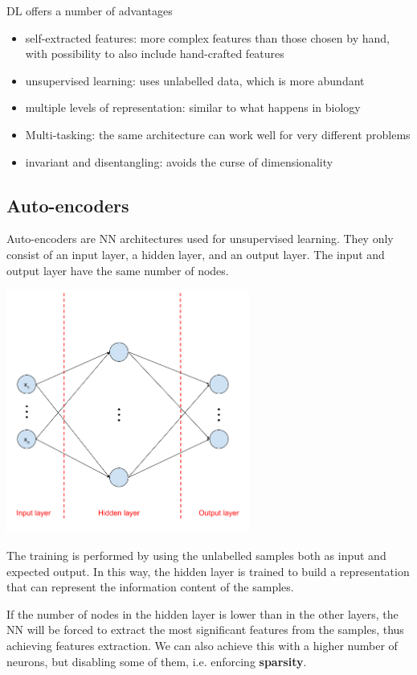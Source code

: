 \documentclass[oneside,onecolumn]{report}
\begin{document}
DL offers a number of advantages
\begin{itemize}
    \item self-extracted features: more complex features than those chosen by hand, with possibility to also include hand-crafted features
    \item unsupervised learning: uses unlabelled data, which is more abundant
    \item multiple levels of representation: similar to what happens in biology
    \item Multi-tasking: the same architecture can work well for very different problems
    \item invariant and disentangling: avoids the curse of dimensionality
\end{itemize}


\subsection{Auto-encoders}
Auto-encoders are NN architectures used for unsupervised learning.
They only consist of an input layer, a hidden layer, and an output layer.
The input and output layer have the same number of nodes.

\begin{center}
    \includegraphics[width=8cm]{autoencoder.png}
\end{center}

The training is performed by using the unlabelled samples both as input and expected output.
In this way, the hidden layer is trained to build a representation that can represent the information content of the samples.

If the number of nodes in the hidden layer is lower than in the other layers, the NN will be forced to extract the most significant features from the samples, thus achieving features extraction.
We can also achieve this with a higher number of neurons, but disabling some of them, i.e. enforcing \textbf{sparsity}.
\end{document}
